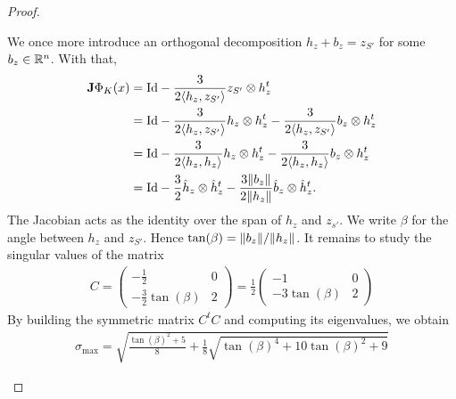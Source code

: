 \documentclass[10pt,a4paper]{article}
\begin{document}
\begin{proof}
\begin{itemize}
        We once more introduce an orthogonal decomposition $h_{z} + b_{z} = z_{S'}$ for some $b_{z} \in {\mathbb R}^{n}$.
        With that,
        \begin{align*}
            {\mathbf{J}} \Phi_{K}(x)
            &=
            {\rm Id} 
            - 
            \frac{3}{ 2 \langle h_{z},z_{S'}\rangle }  
            z_{S'} \otimes h_{z}^{t}
            \\
            &=
            {\rm Id} 
            - 
            \frac{3}{ 2 \langle h_{z},z_{S'}\rangle } 
            h_{z} \otimes h_{z}^{t}
            - 
            \frac{3}{ 2 \langle h_{z},z_{S'}\rangle } 
            b_{z} \otimes h_{z}^{t}
            \\
            &=
            {\rm Id} 
            - 
            \frac{3}{ 2 \langle h_{z}, h_{z}\rangle } 
            h_{z} \otimes h_{z}^{t}
            - 
            \frac{3}{ 2 \langle h_{z}, h_{z}\rangle } 
            b_{z} \otimes h_{z}^{t}
            \\
            &=
            {\rm Id} 
            - 
            \frac{3}{ 2 } 
            \hat h_{z} \otimes \hat h_{z}^{t}
            - 
            \frac{ 3 \|  b_{z}  \| }{ 2 \|  h_{z}  \| } 
            \hat b_{z} \otimes \hat h_{z}^{t}
            .
        \end{align*}
        The Jacobian acts as the identity over the span of $h_{z}$ and $z_{s'}$.
        We write $\beta$ for the angle between $h_{z}$ and $z_{S'}$.
        Hence $\tan(\beta) = \|  b_{z}  \| / \|  h_{z}  \|$. It remains to study the singular values of the matrix 
        \begin{align*}
            C 
            = 
            \begin{pmatrix}
                -\frac 1 2             & 0 
                \\
                -\frac 3 2 \tan(\beta) & 2 
            \end{pmatrix}
            = 
            \frac 1 2 
            \begin{pmatrix}
                -1 & 0 
                \\
                -3\tan(\beta) & 2 
            \end{pmatrix}
        \end{align*}
        By building the symmetric matrix $C^{t} C$ and computing its eigenvalues, we obtain 
        \begin{align*}
            \sigma_{\max} 
            = 
            \sqrt{ \frac{ \tan(\beta)^{2} + 5 }{8} + \frac 1 8 \sqrt{ \tan(\beta)^{4} + 10 \tan(\beta)^{2} + 9 } }

\end{align*}
\end{itemize}
\end{proof}
\end{document}
